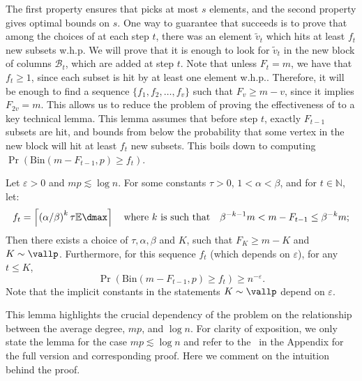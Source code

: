 The first property ensures that \bgreedy picks at most \(s\) elements, and the second property gives optimal bounds on \(s\). 
One way to guarantee that \bgreedy succeeds is to prove that among the choices of \bgreedy at each step \(t\),
there was an element \(\tilde v_t\) which hits at least \(f_t\) new subsets w.h.p. We will prove that 
it is enough to look for \(\tilde v_t\) in 
the new block of columns \(\mathcal{B}_t\), which are added at step \(t\).
Note that unless \(F_t = m\), we have that \(f_t \geq 1\), 
since each subset is hit by at least one element w.h.p.. 
Therefore, it will be enough to find a sequence $\{f_1, f_2, \dots, f_{v}\}$ such that \(F_v \geq m - v\), since it implies \(F_{2v} = m\).
This allows us to reduce the problem of proving the effectiveness of \bgreedy to 
a key technical lemma. This lemma assumes that before step \(t\), exactly \(F_{t - 1}\)
subsets are hit, and bounds from below the probability that some vertex in the new block will hit at least \(f_t\) new subsets. 
This boils down to computing \(\Pr (\mathrm{Bin}(m - F_{t - 1}, p) \geq f_t)\).
\begin{lemma}
\label{lemma:find_one_col_lb_informal}
    Let $\varepsilon > 0$ and \(mp \lesssim \log n\). For some constants \(\tau > 0\), \(1 < \alpha < \beta\), and for \(t \in \mathbb{N}\), let:
    \begin{equation*}
    f_t = \left\lceil\left(\alpha / \beta \right)^k \tau\mathbb{E}\dmax\right\rceil \quad \text{where } k \text{ is such that} \quad \beta^{-k-1}m < m - F_{t-1} \leq \beta^{-k}m;
    \end{equation*}
    \noindent
    Then there exists a choice of \(\tau, \alpha, \beta\) and \(K\), such that \(F_K \geq m - K\) and  \(K \sim \vallp\). Furthermore, for this sequence \(f_t\) (which depends on \(\varepsilon\)), for any \(t \leq K\),
    \begin{equation}
        \Pr (\mathrm{Bin}(m - F_{t - 1}, p) \geq f_t) \geq n^{-\varepsilon}.
    \end{equation} 
\noindent
    Note that the implicit constants in the statements \(K \sim \vallp\) depend on \(\varepsilon\).
\end{lemma}
\noindent
This lemma highlights the crucial dependency of the problem 
on the relationship between the average degree, \(mp\), and \(\log n\). For clarity of exposition, we only state the lemma for the case \(mp \lesssim \log n\) and refer to the~ in the Appendix for the full version and corresponding proof. Here we comment on the intuition behind the proof. 

